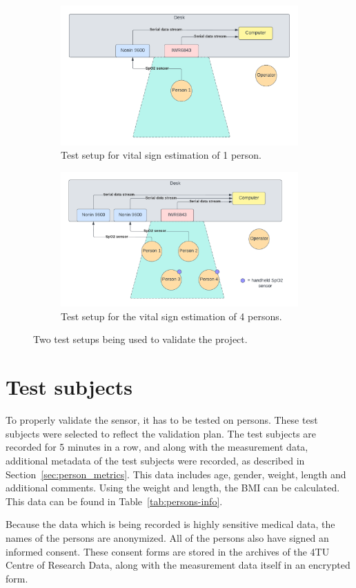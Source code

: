 \begin{figure}[t]
\begin{subfigure}{\textwidth}
  \centering
  \includegraphics[width=.6\linewidth]{figures/validation/test_setup_1.pdf}  
  \caption{Test setup for vital sign estimation of 1 person.}
  \label{fig:test_setup_1}
\end{subfigure}
\begin{subfigure}{\textwidth}
  \centering
  \includegraphics[width=.6\linewidth]{figures/validation/test_setup_4.pdf}  
  \caption{Test setup for the vital sign estimation of 4 persons.}
  \label{fig:test_setup_4}
\end{subfigure}
\caption{Two test setups being used to validate the project.}
\label{fig:test_setup}
\end{figure}

\section{Test subjects}
To properly validate the sensor, it has to be tested on persons. These test subjects were selected to reflect the validation plan. The test subjects are recorded for 5 minutes in a row, and along with the measurement data, additional metadata of the test subjects were recorded, as described in Section~\ref{sec:person_metrics}. This data includes age, gender, weight, length and additional comments. Using the weight and length, the BMI can be calculated. This data can be found in Table~\ref{tab:persons-info}.

Because the data which is being recorded is highly sensitive medical data, the names of the persons are anonymized. All of the persons also have signed an informed consent. These consent forms are stored in the archives of the 4TU Centre of Research Data, along with the measurement data itself in an encrypted form. 

